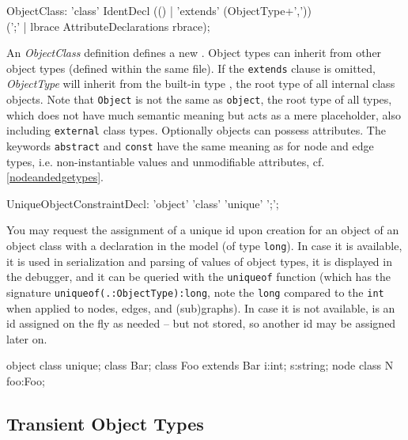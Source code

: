 \begin{rail}
  ObjectClass: 'class' IdentDecl (() | 'extends' (ObjectType+',')) \\
    (';' | lbrace AttributeDeclarations rbrace);
\end{rail}
An \emph{ObjectClass} definition defines a new .
Object types can inherit from other object types (defined within the same file).
If the \texttt{extends} clause is omitted, \emph{ObjectType} will inherit from the built-in type \texttt{}, the root type of all internal class objects.
Note that \texttt{Object} is not the same as \texttt{object}, the root type of all types, which does not have much semantic meaning but acts as a mere placeholder, also including \texttt{external} class types.
Optionally objects can possess attributes.
The keywords \texttt{abstract} and \texttt{const} have the same meaning as for node and edge types, i.e. non-instantiable values and unmodifiable attributes, cf. \ref{nodeandedgetypes}.

\begin{rail}
  UniqueObjectConstraintDecl: 'object' 'class' 'unique' ';';
\end{rail}

You may request the assignment of a unique id upon creation for an object of an object class with a declaration in the model (of type \texttt{long}).
In case it is available, it is used in serialization and parsing of values of object types, it is displayed in the debugger, and it can be queried with the \texttt{uniqueof} function (which has the signature \texttt{uniqueof(.:ObjectType):long}, note the \texttt{long} compared to the \texttt{int} when applied to nodes, edges, and (sub)graphs).
In case it is not available, is an id assigned on the fly as needed -- but not stored, so another id may be assigned later on.

\begin{example}
\begin{grgen}
object class unique;
class Bar;
class Foo extends Bar
{
  i:int;
  s:string;
}
node class N
{
  foo:Foo;
}
\end{grgen}
\end{example}


\subsection{Transient Object Types}

